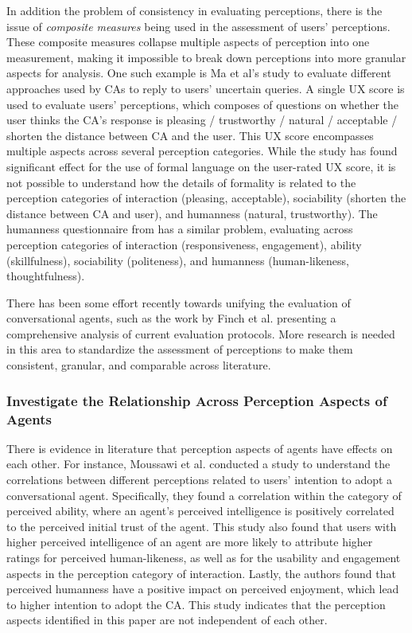 In addition the problem of consistency in evaluating perceptions, there is the issue of  \textit{composite measures} being used in the assessment of users' perceptions. These composite measures collapse multiple aspects of perception into one measurement, making it impossible to break down perceptions into more granular aspects for analysis. One such example is Ma et al's study \cite{ma2022ask}\cmt{[29]} to evaluate different approaches used by CAs to reply to users' uncertain queries. A single UX score is used to evaluate users' perceptions, which composes of questions on whether the user thinks the CA's response is pleasing / trustworthy / natural / acceptable / shorten the distance between CA and the user. This UX score encompasses multiple aspects across several perception categories. While the study has found significant effect for the use of formal language on the user-rated UX score, it is not possible to understand how the details of formality is related to the perception categories of interaction (pleasing, acceptable), sociability (shorten the distance between CA and user), and humanness (natural, trustworthy). The humanness questionnaire from \citet{holtgraves2007perceiving} has a similar problem, evaluating across perception categories of interaction (responsiveness, engagement), ability (skillfulness), sociability (politeness), and humanness (human-likeness, thoughtfulness).

There has been some effort recently towards unifying the evaluation of conversational agents, such as the work by Finch et al. \cite{finch2020towards} presenting a comprehensive analysis of current evaluation protocols. More research is needed in this area to standardize the assessment of perceptions to make them consistent, granular, and comparable across literature.

\subsubsection{Investigate the Relationship Across Perception Aspects of Agents}

There is evidence in literature that perception aspects of agents have effects on each other. For instance, Moussawi et al. \cite{moussawi2021perceptions}\cmt{[36]} conducted a study to understand the correlations between different perceptions related to users' intention to adopt a conversational agent. Specifically, they found a correlation within the category of perceived ability, where an agent's perceived intelligence is positively correlated to the perceived initial trust of the agent. This study also found that users with higher perceived intelligence of an agent are more likely to attribute higher ratings for perceived human-likeness, as well as for the usability and engagement aspects in the perception category of interaction. Lastly, the authors found that perceived humanness have a positive impact on perceived enjoyment, which lead to higher intention to adopt the CA. This study indicates that the perception aspects identified in this paper are not independent of each other.


